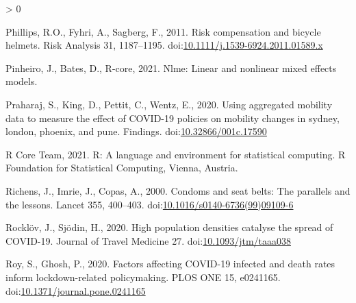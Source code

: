 \documentclass[]{elsarticle} %
\newlength{\cslhangindent}
\newenvironment{CSLReferences}[2] %
 {%
  \setlength{\parindent}{0pt}
  \ifodd #1 \everypar{\setlength{\hangindent}{\cslhangindent}}\ignorespaces\fi
  \ifnum #2 > 0
  \setlength{\parskip}{#2\baselineskip}
  \fi
 }%
 {}
\begin{document}
\begin{CSLReferences}{1}{0}
\leavevmode\hypertarget{ref-Phillips2011risk}{}%
Phillips, R.O., Fyhri, A., Sagberg, F., 2011. Risk compensation and
bicycle helmets. Risk Analysis 31, 1187--1195.
doi:\href{https://doi.org/10.1111/j.1539-6924.2011.01589.x}{10.1111/j.1539-6924.2011.01589.x}

\leavevmode\hypertarget{ref-R-nlme}{}%
Pinheiro, J., Bates, D., R-core, 2021. Nlme: Linear and nonlinear mixed
effects models.

\leavevmode\hypertarget{ref-Praharaj2020Using}{}%
Praharaj, S., King, D., Pettit, C., Wentz, E., 2020. Using aggregated
mobility data to measure the effect of COVID-19 policies on mobility
changes in sydney, london, phoenix, and pune. Findings.
doi:\href{https://doi.org/10.32866/001c.17590}{10.32866/001c.17590}

\leavevmode\hypertarget{ref-R-base}{}%
R Core Team, 2021. R: A language and environment for statistical
computing. R Foundation for Statistical Computing, Vienna, Austria.

\leavevmode\hypertarget{ref-Richens2000condoms}{}%
Richens, J., Imrie, J., Copas, A., 2000. Condoms and seat belts: The
parallels and the lessons. Lancet 355, 400--403.
doi:\href{https://doi.org/10.1016/s0140-6736(99)09109-6}{10.1016/s0140-6736(99)09109-6}

\leavevmode\hypertarget{ref-Rocklov2020high}{}%
Rocklöv, J., Sjödin, H., 2020. High population densities catalyse the
spread of COVID-19. Journal of Travel Medicine 27.
doi:\href{https://doi.org/10.1093/jtm/taaa038}{10.1093/jtm/taaa038}

\leavevmode\hypertarget{ref-Roy2020factors}{}%
Roy, S., Ghosh, P., 2020. Factors affecting COVID-19 infected and death
rates inform lockdown-related policymaking. PLOS ONE 15, e0241165.
doi:\href{https://doi.org/10.1371/journal.pone.0241165}{10.1371/journal.pone.0241165}


\end{CSLReferences}
\end{document}
